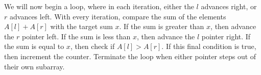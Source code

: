 \documentclass{article}
\begin{document}
\begin{solution}
\begin{center}
    
\end{center}

We will now begin a loop, where in each iteration, either the $l$ advances right, or $r$ advances left.
With every iteration, compare the sum of the elements $A[l]+A[r]$ with the target sum $x$.
If the sum is greater than $x$, then advance the $r$ pointer left. If the sum is less than $x$, then advance the $l$ pointer right.
If the sum is equal to $x$, then check if $A[l]>A[r]$. If this final condition is true, then increment the counter.
Terminate the loop when either pointer steps out of their own subarray.

\end{solution}
\end{document}
